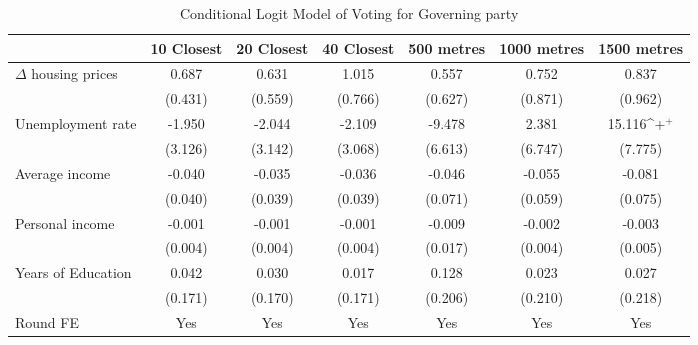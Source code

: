 \begin{table}[htbp]\centering
\def\sym#1{\ifmmode^{#1}\else\(^{#1}\)\fi}
\caption{Conditional Logit Model of Voting for Governing party } \label{indaltspec}
\begin{tabular}{l*{6}{c}}
\hline\hline
                    &\multicolumn{1}{c}{10 Closest}&\multicolumn{1}{c}{20 Closest}&\multicolumn{1}{c}{40 Closest}&\multicolumn{1}{c}{500 metres}&\multicolumn{1}{c}{1000 metres}&\multicolumn{1}{c}{1500 metres}\\
\hline
$\Delta$ housing prices&       0.687       &       0.631       &       1.015       &       0.557       &       0.752       &       0.837       \\
                    &     (0.431)       &     (0.559)       &     (0.766)       &     (0.627)       &     (0.871)       &     (0.962)       \\
[1em]
Unemployment rate   &      -1.950       &      -2.044       &      -2.109       &      -9.478       &       2.381       &      15.116\sym{+}\\
                    &     (3.126)       &     (3.142)       &     (3.068)       &     (6.613)       &     (6.747)       &     (7.775)       \\
[1em]
Average income      &      -0.040       &      -0.035       &      -0.036       &      -0.046       &      -0.055       &      -0.081       \\
                    &     (0.040)       &     (0.039)       &     (0.039)       &     (0.071)       &     (0.059)       &     (0.075)       \\
[1em]
Personal income     &      -0.001       &      -0.001       &      -0.001       &      -0.009       &      -0.002       &      -0.003       \\
                    &     (0.004)       &     (0.004)       &     (0.004)       &     (0.017)       &     (0.004)       &     (0.005)       \\
[1em]
Years of Education  &       0.042       &       0.030       &       0.017       &       0.128       &       0.023       &       0.027       \\
                    &     (0.171)       &     (0.170)       &     (0.171)       &     (0.206)       &     (0.210)       &     (0.218)       \\
[1em]
\hline  Round FE    &         Yes       &         Yes       &         Yes       &         Yes       &         Yes       &         Yes       \\

\end{tabular}
\end{table}
